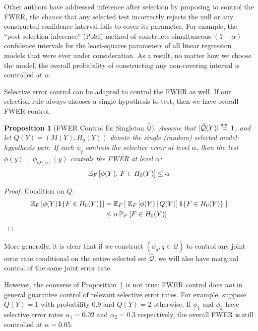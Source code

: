 \documentclass{article}
\newtheorem{proposition}[theorem]{Proposition}
\theoremstyle{definition}
\newcommand{\cQ}{\mathcal{Q}}
\newcommand{\hcQ}{\widehat{\mathcal{Q}}}
\begin{document}
Other authors have addressed inference after selection by proposing to control the FWER, the chance that any selected test incorrectly rejects the null or any constructed confidence interval fails to cover its parameter. For example, the ``post-selection inference'' (PoSI) method of \citet{berk2013valid} constructs simultaneous $(1-\alpha)$ confidence intervals for the least-squares parameters of all linear regression models that were ever under consideration. As a result, no matter how we choose the model, the overall probability of constructing any non-covering interval is controlled at $\alpha$.

Selective error control can be adapted to control the FWER as well. If our selection rule always chooses a single hypothesis to test, then we have overall FWER control.

\begin{proposition}[FWER Control for Singleton $\hcQ$]\label{prop:fwerCont}
  Assume that $|\hcQ(Y)| \eqAS 1$, and let $Q(Y)=(M(Y),H_0(Y))$ denote the single (random) selected model--hypothesis pair. If each $\phi_q$ controls the selective error at level $\alpha$, then the test $\phi(y)=\phi_{Q(y)}(y)$ controls the FWER at level $\alpha$:
\begin{equation}
  \mathbb{E}_F\left[ \phi(Y);\, F\in H_0(Y)\right] \leq \alpha
\end{equation}
\end{proposition}
\begin{proof}
Condition on $Q$:
\begin{align}
  \mathbb{E}_F\left[ \phi(Y)\mathbf{1}\{F\in H_0(Y)\}\right]
    &= \mathbb{E}_F\left[\;\mathbb{E}_F\left[ \phi(Y) \,|\, Q(Y)\right]\mathbf{1}\{F\in H_0(Y)\} \;\right]\\
    &\leq \alpha\,\mathbb{P}_F\left[  F\in H_0(Y) \right]
\end{align}
\end{proof}
More generally, it is clear that if we construct $(\phi_q, q\in\cQ)$ to control any joint error rate conditional on the entire selected set $\hcQ$, we will also have marginal control of the same joint error rate.

However, the converse of Proposition~\ref{prop:fwerCont} is not true: FWER control does {\em not} in general guarantee control of relevant selective error rates. For example, suppose $Q(Y)=1$ with probability 0.9 and $Q(Y)=2$ otherwise. If $\phi_1$ and $\phi_2$ have selective error rates $\alpha_1=0.02$ and $\alpha_2 = 0.3$ respectively, the overall FWER is still controlled at $\alpha=0.05$.
\end{document}
